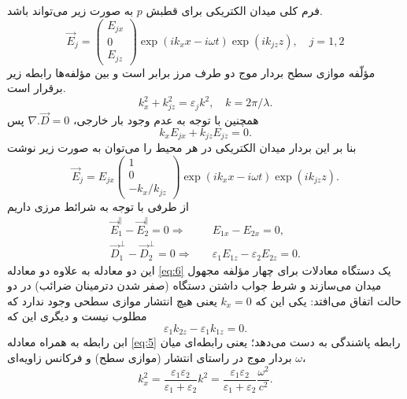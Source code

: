 فرم کلی میدان الکتریکی برای قطبش $p$ به صورت زیر می‌تواند باشد.
\begin{equation}\label{eq:4}
\vec{E}_j=\begin{pmatrix}
E_{jx}\\ 0\\ E_{jz}\end{pmatrix}\exp(ik_xx-i\omega t)\exp(ik_{jz}z),\quad j=1,2
\end{equation}
مؤلّفه موازی سطح بردار موج دو طرف مرز برابر است و بین مؤلفه‌ها رابطه زیر برقرار است.
\begin{equation}\label{eq:5}
k_x^2+k_{jz}^2=\varepsilon_jk^2 ,\quad k=2\pi /\lambda.
\end{equation}
همچنین با توجه به عدم وجود بار خارجی، $\nabla .\vec{D}=0$ پس
\begin{equation}\label{eq:6}
k_xE_{jx}+k_{jz}E_{jz}=0.
\end{equation}
بنا بر این بردار میدان الکتریکی در هر محیط را می‌توان به صورت زیر نوشت
\begin{equation}\label{eq:7}
\vec{E}_j=E_{jx}\begin{pmatrix}1\\ 0\\ -k_x/k_{jz}\end{pmatrix}\exp(ik_xx-i\omega t)\exp(ik_{jz}z).
\end{equation}
از طرفی با توجه به شرائط مرزی داریم
\begin{align}
\vec{E}_1^\parallel -\vec{E}_2^\parallel =0\Rightarrow\quad &E_{1x}-E_{2x}=0,\label{eq:8}\\
\vec{D}_1^\perp -\vec{D}_2^\perp =0\Rightarrow\quad &\varepsilon_1E_{1z}-\varepsilon_2E_{2z}=0.\label{eq:9}
\end{align}
این دو معادله به علاوه دو معادله \ref{eq:6} یک دستگاه معادلات برای چهار مؤلفه مجهول میدان می‌سازند و شرط جواب داشتن دستگاه (صفر شدن دترمینان ضرائب) در دو حالت اتفاق می‌افتد: یکی این که $k_x=0$ یعنی هیچ انتشار موازی سطحی وجود ندارد که مطلوب نیست و دیگری این که
\begin{equation}\label{eq:10}
\varepsilon_1k_{2z}-\varepsilon_1k_{1z}=0.
\end{equation}
ابن رابطه به همراه معادله \ref{eq:5} رابطه پاشندگی به دست می‌دهد؛ یعنی رابطه‌ای میان بردار موج در راستای انتشار (موازی سطح) و فرکانس زاویه‌ای $\omega$،
\begin{equation}\label{eq:11}
k_x^2=\frac{\varepsilon_1\varepsilon_2}{\varepsilon_1+\varepsilon_2}k^2=\frac{\varepsilon_1\varepsilon_2}{\varepsilon_1+\varepsilon_2}\frac{\omega^2}{c^2}.
\end{equation}
